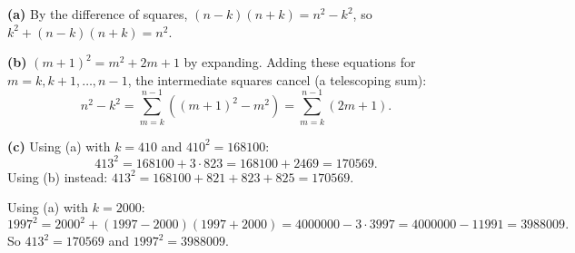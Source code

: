 \textbf{(a)} By the difference of squares, $(n-k)(n+k)=n^2-k^2$, so $k^2+(n-k)(n+k)=n^2$.

\textbf{(b)} $(m+1)^2=m^2+2m+1$ by expanding. Adding these equations for $m=k,k+1,\dots,n-1$, the intermediate squares cancel (a telescoping sum):
\[n^2-k^2=\sum_{m=k}^{n-1}\left((m+1)^2-m^2\right)=\sum_{m=k}^{n-1}(2m+1).\]

\textbf{(c)} Using (a) with $k=410$ and $410^2=168100$:
\[413^2=168100+3\cdot823=168100+2469=170569.\]
Using (b) instead: $413^2=168100+821+823+825=170569$.

Using (a) with $k=2000$:
\[1997^2=2000^2+(1997-2000)(1997+2000)=4000000-3\cdot3997=4000000-11991=3988009.\]
So $413^2=\boxed{170569}$ and $1997^2=\boxed{3988009}$.
